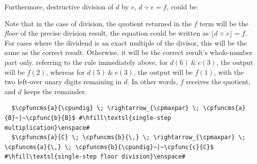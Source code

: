 Furthermore, destructive division of \(d\) by \(e\), \(d \div e = f\), could be:

Note that in the case of division, the quotient returned in the \(f\) term will be the \emph{floor} of the precise division result, \ie{} the equation could be written as \(\lfloor d \div e \rfloor = f\).  For cases where the dividend is an exact multiple of the divisor, this will be the same as the correct result.  Otherwise, it will be the correct result's whole-number part only.  \Eg{} referring to the rule immediately above, for \(d(6)~\&~e(3)\), the output will be \(f(2)\), whereas for \(d(5)~\&~e(3)\), the output will be \(f(1)\), with the two left-over unary digits remaining in \(d\).  In other words, \(f\) receives the quotient, and \(d\) keeps the remainder.

\lstset{xleftmargin=.5in, xrightmargin=.5in} 
\begin{lstlisting}
  $\cpfuncms{a}{\cpundig} \; \rightarrow_{\cpmaxpar} \; \cpfuncms{a}{B}~|~\cpfunc{b}{B}$ #\hfill\textsl{single-step multiplication}\enspace#
  $\cpfuncms{a}{C} \; \cpfuncms{b}{\,} \; \rightarrow_{\cpmaxpar} \; \cpfuncms{a}{\,} \; \cpfuncms{b}{\cpundig}~|~\cpfunc{c}{C}$ #\hfill\textsl{single-step floor division}\enspace#
\end{lstlisting}